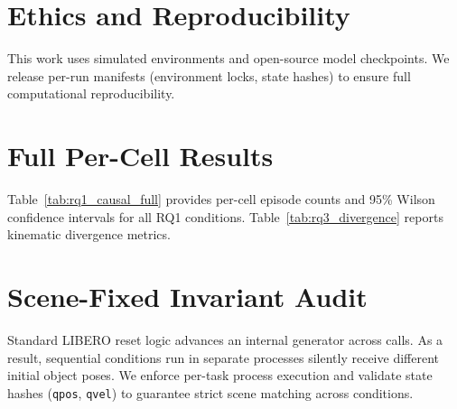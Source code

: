 \documentclass[11pt]{article}
\begin{document}
\section*{Ethics and Reproducibility}
This work uses simulated environments and open-source model checkpoints. We release per-run manifests (environment locks, state hashes) to ensure full computational reproducibility.





\appendix

\section{Full Per-Cell Results}
\label{app:full}
Table~\ref{tab:rq1_causal_full} provides per-cell episode counts and 95\% Wilson confidence intervals for all RQ1 conditions. Table~\ref{tab:rq3_divergence} reports kinematic divergence metrics.

\begin{table}[t]
\centering
\small
\resizebox{\ifdim\width>\linewidth\linewidth\else\width\fi}{!}{}
\caption{\textbf{Complete Per-Cell RQ1 Experimental Results.} Detailed breakdown of Task Success Rates (TSR), 95\% Wilson score confidence intervals, sample sizes $n$, and Causal Sensitivity Scores (CSS) across all 3 model architectures and 7 instruction conditions on \texttt{LIBERO-Goal}.}
\label{tab:rq1_causal_full}
\end{table}

\begin{table}[tb]
\centering
\small

\caption{\textbf{Kinematic Trajectory Divergence Metrics.} Quantitative trajectory departure steps ($t_{\text{div}}$, threshold $\tau = 5$\,cm) and 10-step end-effector spatial displacement ($e_{10}$ in meters) between canonical and perturbed rollouts sharing identical initial physical simulator states $S_0$.}
\label{tab:rq3_divergence}
\end{table}

\section{Scene-Fixed Invariant Audit}
\label{sec:scenefixed-audit}
Standard LIBERO reset logic advances an internal generator across calls. As a result, sequential conditions run in separate processes silently receive different initial object poses. We enforce per-task process execution and validate state hashes (\texttt{qpos}, \texttt{qvel}) to guarantee strict scene matching across conditions.
\end{document}
